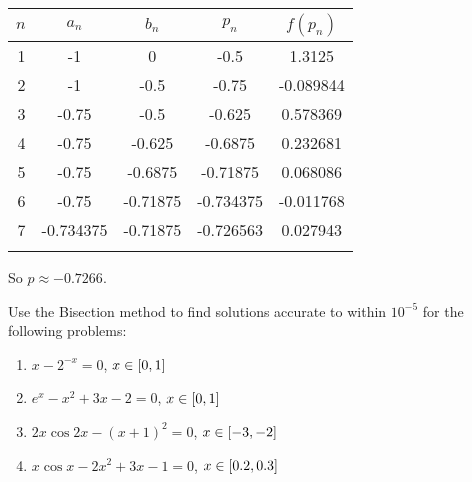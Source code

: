 \documentclass[../../Assignments.tex]{subfiles}
\begin{document}
\begin{solution}
\begin{enumerate}[label=(\alph*)]
            \begin{tabular}{r S[table-format=-1.6] S[table-format=-1.5] S[table-format=-1.6] S[table-format=-1.6]}
                \\
                \toprule
                \(n\)  &  {\(a_n\)}  &  {\(b_n\)}  &  {\(p_n\)}  &  {\(f(p_n)\)}  \\
                  &  -1         &  0          &  -0.5       &   1.3125       \\
                    2  &  -1         &  -0.5       &  -0.75      &  -0.089844     \\
                    3  &  -0.75      &  -0.5       &  -0.625     &   0.578369     \\
                    4  &  -0.75      &  -0.625     &  -0.6875    &   0.232681     \\
                    5  &  -0.75      &  -0.6875    &  -0.71875   &   0.068086     \\
                    6  &  -0.75      &  -0.71875   &  -0.734375  &  -0.011768     \\
                    7  &  -0.734375  &  -0.71875   &  -0.726563  &   0.027943     \\
                \bottomrule
                \\
            \end{tabular}

            So \(p \approx \num{-0.7266}\).
    \end{enumerate}
\end{solution}

\begin{exercise}
    Use the Bisection method to find solutions accurate to within \(10^{-5}\)
    for the following problems:

    \begin{enumerate}[label=(\alph*)]
        \item \(x - 2^{-x} = 0\), \(x \in \interval{0}{1}\)
        \item \(e^x - x^2 + 3x - 2 = 0\), \(x \in \interval{0}{1}\)
        \item \(2 x \cos{2x} - (x + 1)^2 = 0\), \(x \in \interval{-3}{-2}\)
        \item \(x \cos{x} - 2x^2 + 3x - 1 = 0\), \(x \in \interval{\num{0.2}}{\num{0.3}}\)
    \end{enumerate}
\end{exercise}
\end{document}
